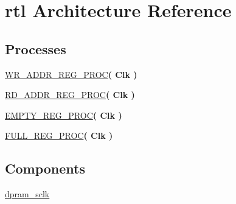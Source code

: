 \hypertarget{classfifo_1_1rtl}{}\section{rtl Architecture Reference}
\label{classfifo_1_1rtl}
\subsection*{Processes}
 \begin{DoxyCompactItemize}
\item 
\hyperlink{classfifo_1_1rtl_a2654612b58006805c38d3d9e6a7d62a4}{W\+R\+\_\+\+A\+D\+D\+R\+\_\+\+R\+E\+G\+\_\+\+P\+R\+OC}{\bfseries  ( {\bfseries \textcolor{vhdlchar}{Clk}\textcolor{vhdlchar}{ }} )}\hypertarget{classfifo_1_1rtl_a2654612b58006805c38d3d9e6a7d62a4}{}\label{classfifo_1_1rtl_a2654612b58006805c38d3d9e6a7d62a4}

\item 
\hyperlink{classfifo_1_1rtl_ad4e827bc8d122a2055ea847b8564430b}{R\+D\+\_\+\+A\+D\+D\+R\+\_\+\+R\+E\+G\+\_\+\+P\+R\+OC}{\bfseries  ( {\bfseries \textcolor{vhdlchar}{Clk}\textcolor{vhdlchar}{ }} )}\hypertarget{classfifo_1_1rtl_ad4e827bc8d122a2055ea847b8564430b}{}\label{classfifo_1_1rtl_ad4e827bc8d122a2055ea847b8564430b}

\item 
\hyperlink{classfifo_1_1rtl_aaf6ec87fb17875ec60f95c28526c01a9}{E\+M\+P\+T\+Y\+\_\+\+R\+E\+G\+\_\+\+P\+R\+OC}{\bfseries  ( {\bfseries \textcolor{vhdlchar}{Clk}\textcolor{vhdlchar}{ }} )}\hypertarget{classfifo_1_1rtl_aaf6ec87fb17875ec60f95c28526c01a9}{}\label{classfifo_1_1rtl_aaf6ec87fb17875ec60f95c28526c01a9}

\item 
\hyperlink{classfifo_1_1rtl_a10df8b84e4c6aee0b7a1eb12a6a32ff5}{F\+U\+L\+L\+\_\+\+R\+E\+G\+\_\+\+P\+R\+OC}{\bfseries  ( {\bfseries \textcolor{vhdlchar}{Clk}\textcolor{vhdlchar}{ }} )}\hypertarget{classfifo_1_1rtl_a10df8b84e4c6aee0b7a1eb12a6a32ff5}{}\label{classfifo_1_1rtl_a10df8b84e4c6aee0b7a1eb12a6a32ff5}

\end{DoxyCompactItemize}
\subsection*{Components}
 \begin{DoxyCompactItemize}
\item 
\hyperlink{classfifo_1_1rtl_ad0ca95520177ee6b54fa5a8a6e7f7f85}{dpram\+\_\+sclk}  {\bfseries }  \hypertarget{classfifo_1_1rtl_ad0ca95520177ee6b54fa5a8a6e7f7f85}{}\label{classfifo_1_1rtl_ad0ca95520177ee6b54fa5a8a6e7f7f85}

\end{DoxyCompactItemize}

